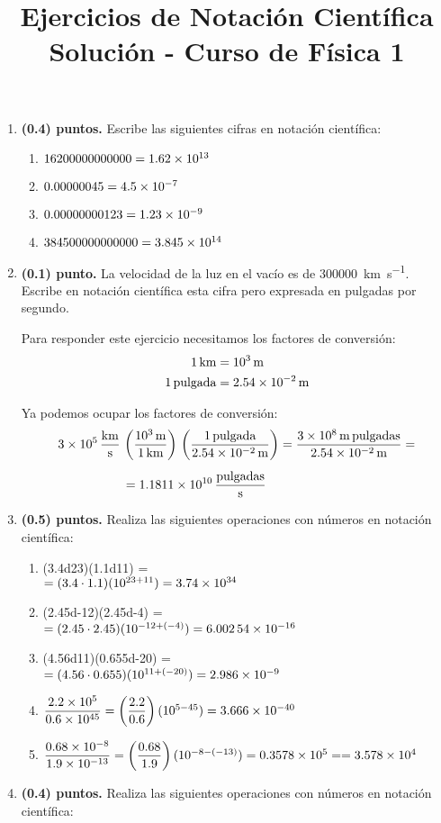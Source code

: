 \documentclass[14pt]{extarticle}
\title{\vspace*{-2cm} Ejercicios de Notación Científica \\  Solución - Curso de Física 1\vspace{-5ex}}
\date{}
\begin{document}
\maketitle

\begin{enumerate}
\item \textbf{(0.4) puntos.} Escribe las siguientes cifras en notación científica:
\begin{enumerate}
\item $16200000000000 = \num{1.62d13}$
\item $0.00000045 = \num{4.5d-7}$
\item $0.00000000123 = \num{1.23d-9}$
\item $384500000000000 = \num{3.845d14}$
\end{enumerate}
\item \textbf{(0.1) punto.} La velocidad de la luz en el vacío es de \SI[per-mode=symbol]{300000}{\kilo\meter\per\second}. Escribe en notación científica esta cifra pero expresada en pulgadas por segundo.

Para responder este ejercicio necesitamos los factores de conversión:
\begin{align*}
\SI{1}{\kilo\meter} &= \SI{d3}{\meter} \\
1 \, \text{pulgada} &= \SI{2.54d-2}{\meter}
\end{align*}

Ya podemos ocupar los factores de conversión:
\begin{align*}
\SI{3d5}{\kilo\meter\per\second} \, &\left( \dfrac{\SI{d3}{\meter}}{\SI{1}{\kilo\meter}} \right) \, \left( \dfrac{1 \, \text{pulgada}}{\SI{2.54d-2}{\meter}} \right) = \dfrac{\SI{3d8}{\meter} \, \text{pulgadas}}{\SI{2.54d-2}{\meter}} = \\[0.5em]
&= \num{1.1811d10} \, \dfrac{\text{pulgadas}}{\unit{\second}}
\end{align*}
\item \textbf{(0.5) puntos.} Realiza las siguientes operaciones con números en notación científica:
\begin{enumerate}
\item (\num{3.4d23})(\num{1.1d11}) = \\[0.5em]
$= (3.4 \cdot 1.1)(10^{23+11}) = \num{3.74d34}$
\item (\num{2.45d-12})(\num{2.45d-4}) = \\[0.5em]
$= (2.45 \cdot 2.45)(10^{-12+(-4)}) = \num{6.00254d-16}$
\item (\num{4.56d11})(\num{0.655d-20}) = \\[0.5em]
$= (4.56 \cdot 0.655)(10^{11+(-20)}) = \num{2.986d-9}$
\item $\dfrac{\num{2.2d5}}{\num{0.6d45}} = \left( \dfrac{2.2}{0.6} \right) (10^{5-45}) = \num{3.666d-40}$
\item $\dfrac{\num{0.68d-8}}{\num{1.9d-13}}= \left( \dfrac{0.68}{1.9} \right) (10^{-8-(-13)}) = \num{0.3578d5} = \\[0.5em]
= \num{3.578d4}$
\end{enumerate}
\item \textbf{(0.4) puntos.} Realiza las siguientes operaciones con números en notación científica:


\end{enumerate}
\end{document}
